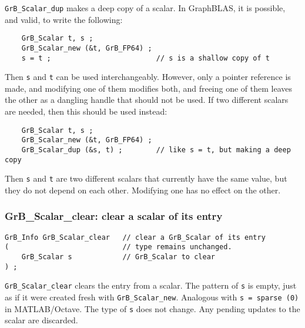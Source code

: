 \documentclass[12pt]{article}
\begin{document}
\verb'GrB_Scalar_dup' makes a deep copy of a scalar.
In GraphBLAS, it is possible, and valid, to write the following:

    {\footnotesize
    \begin{verbatim}
    GrB_Scalar t, s ;
    GrB_Scalar_new (&t, GrB_FP64) ;
    s = t ;                         // s is a shallow copy of t  \end{verbatim}}

Then \verb's' and \verb't' can be used interchangeably.  However, only a pointer
reference is made, and modifying one of them modifies both, and freeing one of
them leaves the other as a dangling handle that should not be used.
If two different scalars are needed, then this should be used instead:

    {\footnotesize
    \begin{verbatim}
    GrB_Scalar t, s ;
    GrB_Scalar_new (&t, GrB_FP64) ;
    GrB_Scalar_dup (&s, t) ;        // like s = t, but making a deep copy \end{verbatim}}

Then \verb's' and \verb't' are two different scalars that currently have
the same value, but they do not depend on each other.  Modifying one has no
effect on the other.

\subsubsection{{\sf GrB\_Scalar\_clear:} clear a scalar of its entry}
\label{scalar_clear}

\begin{mdframed}[userdefinedwidth=6in]
{\footnotesize
\begin{verbatim}
GrB_Info GrB_Scalar_clear   // clear a GrB_Scalar of its entry
(                           // type remains unchanged.
    GrB_Scalar s            // GrB_Scalar to clear
) ;
\end{verbatim}
} \end{mdframed}

\verb'GrB_Scalar_clear' clears the entry from a scalar.  The pattern of
\verb's' is empty, just as if it were created fresh with \verb'GrB_Scalar_new'.
Analogous with \verb's = sparse (0)' in MATLAB/Octave.  The type of \verb's' does not
change.  Any pending updates to the scalar are discarded.

\newpage
\end{document}
